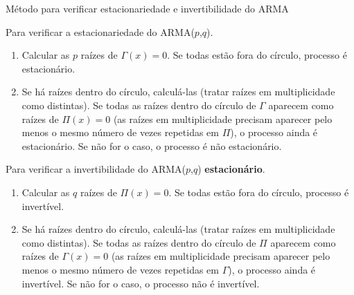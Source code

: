 \documentclass[11pt]{beamer}
\newenvironment{halfwideitemize}{\itemize\addtolength{\itemsep}{0.5em}}{\enditemize}
\begin{document}
\begin{frame}{Método para verificar estacionariedade e invertibilidade do ARMA}
	\begin{halfwideitemize}
		\item Para verificar a estacionariedade do ARMA($p$,$q$).
		\begin{enumerate}
			\item Calcular as $p$ raízes de $\Gamma(x) = 0$. Se todas estão fora do círculo, processo é estacionário.
			\item Se há raízes dentro do círculo, calculá-las (tratar raízes em multiplicidade como distintas). Se todas as raízes dentro do círculo de $\Gamma$ aparecem como raízes de $\Pi(x) = 0$ (as raízes em multiplicidade  precisam aparecer pelo menos o mesmo número de vezes repetidas em $\Pi$), o  processo ainda é estacionário. Se não for o caso, o processo é não estacionário.
		\end{enumerate}
		
			\item Para verificar a invertibilidade do ARMA($p$,$q$) \textbf{estacionário}.
		\begin{enumerate}
			\item Calcular as $q$ raízes de $\Pi(x) = 0$. Se todas estão fora do círculo, processo é invertível.
			\item Se há raízes dentro do círculo, calculá-las (tratar raízes em multiplicidade como distintas). Se todas as raízes dentro do círculo de $\Pi$ aparecem como raízes de $\Gamma(x) = 0$ (as raízes em multiplicidade  precisam aparecer pelo menos o mesmo número de vezes repetidas em $\Gamma$), o  processo ainda é invertível. Se não for o caso, o processo não é invertível.
		\end{enumerate}
	\end{halfwideitemize}
\end{frame}
\end{document}
